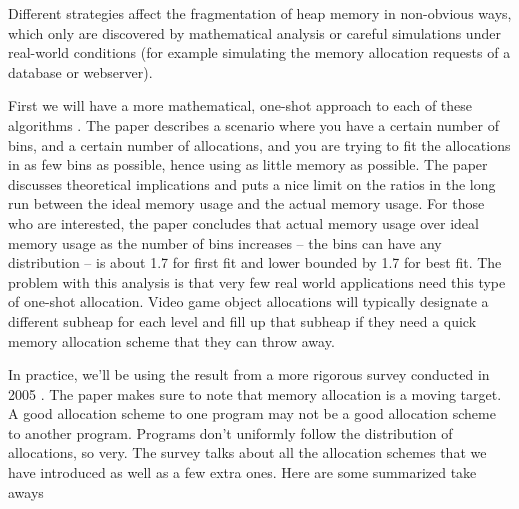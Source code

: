 Different strategies affect the fragmentation of heap memory in non-obvious ways, which only are discovered by mathematical analysis or careful simulations under real-world conditions (for example simulating the memory allocation requests of a database or webserver).


First we will have a more mathematical, one-shot approach to each of these algorithms \cite{Garey:1972:WAM:800152.804907}. The paper describes a scenario where you have a certain number of bins, and a certain number of allocations, and you are trying to fit the allocations in as few bins as possible, hence using as little memory as possible.
The paper discusses theoretical implications and puts a nice limit on the ratios in the long run between the ideal memory usage and the actual memory usage.
For those who are interested, the paper concludes that actual memory usage over ideal memory usage as the number of bins increases -- the bins can have any distribution -- is about 1.7 for first fit and lower bounded by 1.7 for best fit.
The problem with this analysis is that very few real world applications need this type of one-shot allocation.
Video game object allocations will typically designate a different subheap for each level and fill up that subheap if they need a quick memory allocation scheme that they can throw away.

In practice, we'll be using the result from a more rigorous survey conducted in 2005 \cite{10.1007/3-540-60368-9_19}.
The paper makes sure to note that memory allocation is a moving target.
A good allocation scheme to one program may not be a good allocation scheme to another program.
Programs don't uniformly follow the distribution of allocations, so very.
The survey talks about all the allocation schemes that we have introduced as well as a few extra ones.
Here are some summarized take aways

